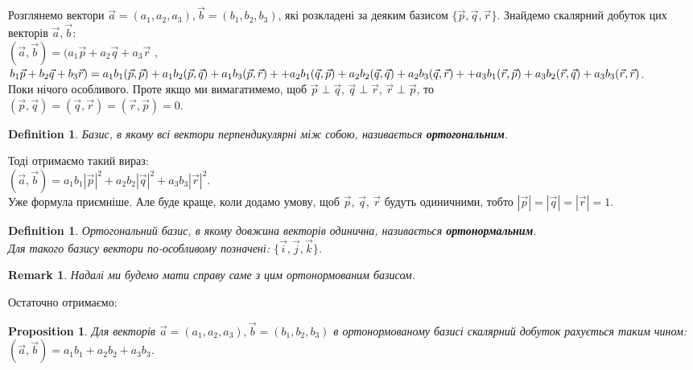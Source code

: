 \documentclass[a4paper, 10pt]{extarticle}
\theoremstyle{theoremdd}
\theoremstyle{theoremdd}
\newtheorem{definition}[theorem]{Definition}
\theoremstyle{theoremdd}
\theoremstyle{theoremdd}
\theoremstyle{theoremdd}
\newtheorem{proposition}[theorem]{Proposition}
\theoremstyle{theoremdd}
\newtheorem{remark}[theorem]{Remark}
\theoremstyle{theoremdd}
\theoremstyle{theoremdd}
\begin{document}
	Розглянемо вектори $\vec{a} = (a_1, a_2, a_3), \vec{b} = (b_1, b_2, b_3)$, які розкладені за деяким базисом $\{\vec{p}, \vec{q}, \vec{r}\}$. Знайдемо скалярний добуток цих векторів $\vec{a},\vec{b}$:\\
	$(\vec{a}, \vec{b}) = (a_1\vec{p} + a_2\vec{q} + a_3\vec{r}$ , $b_1\vec{p} + b_2\vec{q} + b_3\vec{r}) = \\
	a_1 b_1 (\vec{p}, \vec{p}) + a_1 b_2 (\vec{p}, \vec{q}) + a_1 b_3 (\vec{p}, \vec{r}) + 
	+ a_2 b_1 (\vec{q}, \vec{p}) + a_2 b_2 (\vec{q}, \vec{q}) + a_2 b_3 (\vec{q}, \vec{r}) + 
	+ a_3 b_1 (\vec{r}, \vec{p}) + a_3 b_2 (\vec{r}, \vec{q}) + a_3 b_3 (\vec{r}, \vec{r})$.\\
	Поки нічого особливого. Проте якщо ми вимагатимемо, щоб $\vec{p} \perp \vec{q}$, $\vec{q} \perp \vec{r}$, $\vec{r} \perp \vec{p}$, то \\
	$(\vec{p}, \vec{q}) = (\vec{q}, \vec{r}) = (\vec{r}, \vec{p}) = 0$.
	
\begin{definition}
	Базис, в якому всі вектори перпендикулярні між собою, називається \textbf{ортогональним}.
\end{definition}

	Тоді отримаємо такий вираз:\\
	$(\vec{a}, \vec{b}) = a_1 b_1 |\vec{p}|^2 + a_2 b_2 |\vec{q}|^2 + a_3 b_3 |\vec{r}|^2$.\\
	Уже формула приємніше. Але буде краще, коли додамо умову, щоб $\vec{p}$, $\vec{q}$, $\vec{r}$ будуть одиничними, тобто $|\vec{p}| = |\vec{q}| = |\vec{r}| = 1$.
	
\begin{definition}
	Ортогональний базис, в якому довжина векторів одинична, називається \textbf{ортонормальним}.\\
	Для такого базису вектори по-особливому позначені: $\{\vec{i}, \vec{j}, \vec{k}\}$.
\end{definition}

\begin{remark}
	Надалі ми будемо мати справу саме з цим ортонормованим базисом.
\end{remark}

	Остаточно отримаємо:
\begin{proposition}
	Для векторів $\vec{a} = (a_1, a_2, a_3), \vec{b} = (b_1, b_2, b_3)$ в ортонормованому базисі скалярний добуток рахується таким чином: $(\vec{a}, \vec{b}) = a_1 b_1 + a_2 b_2 + a_3 b_3$.
\end{proposition}
\end{document}
